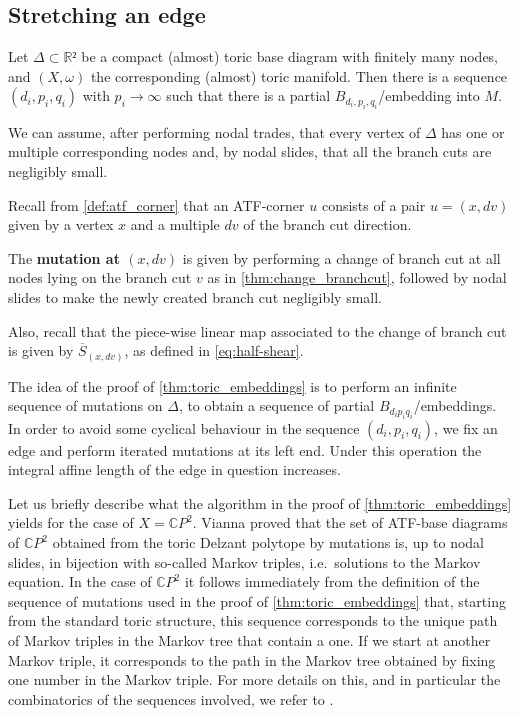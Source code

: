 \documentclass[AIF,Unicode,manuscript]{cedram}
\begin{document}
\subsection{Stretching an edge}
\label{sec:stretch_edge}

\begin{proposition}
  \label{thm:toric_embeddings}
  Let $Δ ⊂ ℝ²$ be a compact (almost) toric base diagram with finitely many nodes, and $(X,ω)$ the corresponding (almost) toric manifold.
  Then there is a sequence $(d_i,p_i,q_i)$ with $p_i → ∞$ such that there is a partial $B_{d_i,p_i,q_i}$\-/embedding into $M$.
\end{proposition}

We can assume, after performing nodal trades, that every vertex of $Δ$ has one or multiple corresponding nodes and, by nodal slides, that all the branch cuts are negligibly small.

Recall from \cref{def:atf_corner} that an ATF-corner $u$ consists of a pair $u=(x,dv)$ given by a vertex $x$ and a multiple $dv$ of the branch cut direction.

\begin{definition}
  \label{def:mutation_at_atf_corner}
  The \textbf{mutation at $(x,dv)$} is given by performing a change of branch cut at all nodes lying on the branch cut $v$ as in \cref{thm:change_branchcut}, followed by nodal slides to make the newly created branch cut negligibly small.
\end{definition}

Also, recall that the piece-wise linear map associated to the change of branch cut is given by $\overline{S}_{(x,dv)}$, as defined in \eqref{eq:half-shear}.

The idea of the proof of \cref{thm:toric_embeddings} is to perform an infinite sequence of mutations on $Δ$, to obtain a sequence of partial $B_{d_i p_i q_i}$\-/embeddings.
In order to avoid some cyclical behaviour in the sequence $(d_i,p_i,q_i)$, we fix an edge and perform iterated mutations at its left end.
Under this operation the integral affine length of the edge in question increases.

\begin{remark}
  Let us briefly describe what the algorithm in the proof of \cref{thm:toric_embeddings} yields for the case of $X = \mathbb{C}P^2$.
  Vianna \cite{Via16} proved that the set of ATF-base diagrams of $\mathbb{C}P^2$ obtained from the toric Delzant polytope by mutations is, up to nodal slides, in bijection with so-called Markov triples, i.e.\ solutions to the Markov equation.
  In the case of $\mathbb{C}P^2$ it follows immediately from the definition of the sequence of mutations used in the proof of \cref{thm:toric_embeddings} that, starting from the standard toric structure, this sequence corresponds to the unique path of Markov triples in the Markov tree that contain a one.
  If we start at another Markov triple, it corresponds to the path in the Markov tree obtained by fixing one number in the Markov triple.
For more details on this, and in particular the combinatorics of the sequences involved, we refer to \cite[Section~8.4, Appendix~I]{evans2021atfs}.
\end{remark}
\end{document}
